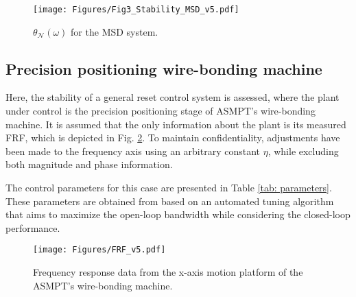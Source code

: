 
\begin{table*}[]
\centering
\caption{Controller parameters.}
\label{tab: parameters}
\end{table*}
\begin{figure}[!t]
\centering
\texttt{[image: Figures/Fig3\_Stability\_MSD\_v5.pdf]}	\caption{$\theta_{\mathcal{N}}(\omega)$ for the MSD system.}
	\label{fig: theta_N MSD}
\end{figure}
\subsection{Precision positioning wire-bonding machine}
Here, the stability of a general reset control system is assessed, where the plant under control is the precision positioning stage of ASMPT's wire-bonding machine. It is assumed that the only information about the plant is its measured FRF, which is depicted in Fig. \ref{fig: FRF}. To maintain confidentiality, adjustments have been made to the frequency axis using an arbitrary constant $\eta$, while excluding both magnitude and phase information.

The control parameters for this case are presented in Table \ref{tab: parameters}. These parameters are obtained from \cite{Yixuan} based on an automated tuning algorithm that aims to maximize the open-loop bandwidth while considering the closed-loop performance.

\begin{figure}
	\centering
 	\texttt{[image: Figures/FRF\_v5.pdf]}
	\caption{Frequency response data from the x-axis motion platform of the ASMPT's wire-bonding machine.}
	\label{fig: FRF}
\end{figure}

